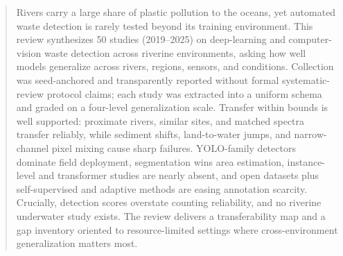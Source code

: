 \begin{abstract}
Rivers carry a large share of plastic pollution to the oceans, yet automated waste detection is rarely tested beyond its training environment. This review synthesizes 50 studies (2019--2025) on deep-learning and computer-vision waste detection across riverine environments, asking how well models generalize across rivers, regions, sensors, and conditions. Collection was seed-anchored and transparently reported without formal systematic-review protocol claims; each study was extracted into a uniform schema and graded on a four-level generalization scale. Transfer within bounds is well supported: proximate rivers, similar sites, and matched spectra transfer reliably, while sediment shifts, land-to-water jumps, and narrow-channel pixel mixing cause sharp failures. YOLO-family detectors dominate field deployment, segmentation wins area estimation, instance-level and transformer studies are nearly absent, and open datasets plus self-supervised and adaptive methods are easing annotation scarcity. Crucially, detection scores overstate counting reliability, and no riverine underwater study exists. The review delivers a transferability map and a gap inventory oriented to resource-limited settings where cross-environment generalization matters most.
\end{abstract}
